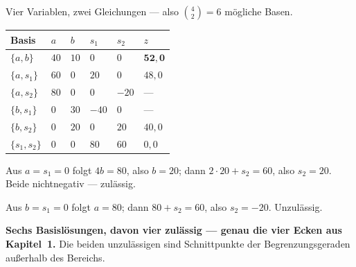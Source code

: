 \begin{merksatz}
Vier Variablen, zwei Gleichungen --- also $\binom{4}{2} = 6$ mögliche Basen.

\begin{center}
{\small
\renewcommand{\arraystretch}{1.46}
\begin{tabular}{@{}P{1.8cm}P{1.4cm}P{1.4cm}P{1.4cm}P{1.4cm}P{1.6cm}@{}}
\toprule
\textbf{Basis} & $a$ & $b$ & $s_1$ & $s_2$ & $z$\\
\midrule
$\{a,b\}$ & $40$ & $10$ & $0$ & $0$ & $\mathbf{52{,}0}$\\
$\{a,s_1\}$ & $60$ & $0$ & $20$ & $0$ & $48{,}0$\\
$\{a,s_2\}$ & $80$ & $0$ & $0$ & \textcolor{akzent}{$-20$} & ---\\
$\{b,s_1\}$ & $0$ & $30$ & \textcolor{akzent}{$-40$} & $0$ & ---\\
$\{b,s_2\}$ & $0$ & $20$ & $0$ & $20$ & $40{,}0$\\
$\{s_1,s_2\}$ & $0$ & $0$ & $80$ & $60$ & $0{,}0$\\
\bottomrule
\end{tabular}}
\end{center}

 Aus $a = s_1 = 0$ folgt $4b = 80$, also $b=20$; dann $2\cdot20 + s_2 = 60$, also $s_2 = 20$. Beide nichtnegativ --- zulässig.

 Aus $b = s_1 = 0$ folgt $a = 80$; dann $80 + s_2 = 60$, also $s_2 = -20$. Unzulässig.

\begin{center}
\begin{minipage}{0.9\textwidth}
\textbf{Sechs Basislösungen, davon vier zulässig --- genau die vier Ecken aus Kapitel~1.} Die beiden unzulässigen sind Schnittpunkte der Begrenzungsgeraden außerhalb des Bereichs.
\end{minipage}
\end{center}

\begin{center}
\begin{minipage}{0.88\textwidth}
\end{minipage}
\end{center}
\end{merksatz}

